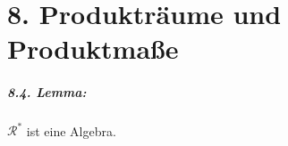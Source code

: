 \documentclass[11pt]{report}
\begin{document}
\tableofcontents
\newpage


\newcommand{\E}{\mathbb{E}}
\newcommand{\cR}{\mathcal{R}}
\newcommand{\cB}{\mathcal{B}}
\newcommand{\C}{\mathbb{C}}
\newcommand{\del}{\partial}
\newcommand{\A}{\mathcal{A}}
\newcommand{\G}{\mathcal{G}}
\renewcommand{\geq}{\geqslant}
\renewcommand{\leq}{\leqslant}
\newcommand{\eps}{\varepsilon}
\newcommand{\Pp}{\mathbb{P}}
\newcommand{\R}{\mathbb{R}}
\newcommand{\Var}{\operatorname{Var}}
\newcommand{\pspace}{(\Omega, \mathcal{A}, \Pp)}
\newcommand{\borel}{\mathcal{B}(\R)}
\newcommand{\ind}[1]{\mathds{1}_{#1}}
\newcommand{\nto}[2]{\xrightarrow[#2]{\makebox[1.5em][c]{$\scriptstyle#1$}}}‌

\chapter*{8. Produktr\"aume und Produktma\ss{}e}
\paragraph{8.4. Lemma:}$\cR^*$ ist eine Algebra.
\end{document}
